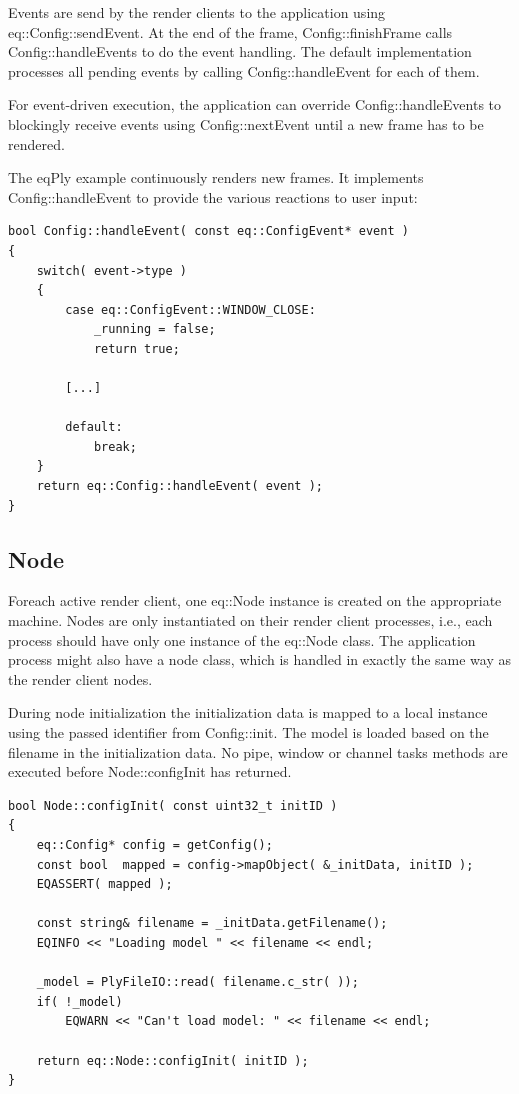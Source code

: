 \documentclass[10pt,a4]{scrartcl}
\begin{document}
Events are send by the render clients to the application using
{eq::Config::sendEvent}. At the end of the frame,
\textsf{Config::finishFrame} calls \textsf{Config::handleEvents} to do
the event handling. The default implementation processes all pending
events by calling \textsf{Config::handleEvent} for each of them.

For event-driven execution, the application can override
\textsf{Config::handleEvents} to blockingly receive events using
\textsf{Config::nextEvent} until a new frame has to be rendered.

The \textsf{eqPly} example continuously renders new frames. It
implements \textsf{Config::hand\-le\-Event} to provide the various reactions
to user input:

{\footnotesize\begin{lstlisting}
bool Config::handleEvent( const eq::ConfigEvent* event )
{
    switch( event->type )
    {
        case eq::ConfigEvent::WINDOW_CLOSE:
            _running = false;
            return true;

        [...]

        default:
            break;
    }
    return eq::Config::handleEvent( event );
}
\end{lstlisting}}


\subsection{Node}

Foreach active render client, one \textsf{eq::Node} instance is
created on the appropriate machine. Nodes are only instantiated on their
render client processes, i.e., each process should have only one
instance of the \textsf{eq::Node} class. The application process might
also have a node class, which is handled in exactly the same way as the
render client nodes.

During node initialization the initialization data is mapped to
a local instance using the passed identifier from
\textsf{Config::init}. The model is loaded based on the filename in the
initialization data. No pipe, window or channel tasks methods are
executed before \textsf{Node::configInit} has returned.

{\footnotesize\begin{lstlisting}
bool Node::configInit( const uint32_t initID )
{
    eq::Config* config = getConfig();
    const bool  mapped = config->mapObject( &_initData, initID );
    EQASSERT( mapped );

    const string& filename = _initData.getFilename();
    EQINFO << "Loading model " << filename << endl;

    _model = PlyFileIO::read( filename.c_str( ));
    if( !_model)
        EQWARN << "Can't load model: " << filename << endl;

    return eq::Node::configInit( initID );
}
\end{lstlisting}}%
\end{document}
